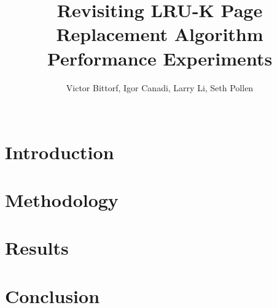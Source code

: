 \documentclass{sig-alternate}
\begin{document}
\title{Revisiting LRU-K Page Replacement Algorithm Performance Experiments}

\author{
	\alignauthor Victor Bittorf, Igor Canadi, Larry Li, Seth Pollen\\
	\\
}

\maketitle



\section{Introduction}
\label{sec:intro}


\section{Methodology}
\label{sec:method}


\section{Results}
\label{sec:results}


\section{Conclusion}
\label{sec:conc}





\end{document}
